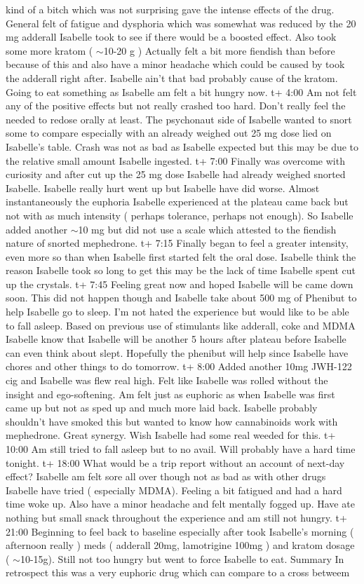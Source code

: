 \documentclass[12pt]{book}
\begin{document}
kind of a bitch which was not surprising gave the intense effects of the drug. General felt of fatigue and dysphoria which was somewhat was reduced by the 20 mg adderall Isabelle took to see if there would be a boosted effect. Also took some more kratom ( $\sim$10-20 g ) Actually felt a bit more fiendish than before because of this and also have a minor headache which could be caused by took the adderall right after. Isabelle ain't that bad probably cause of the kratom. Going to eat something as Isabelle am felt a bit hungry now. t+ 4:00 Am not felt any of the positive effects but not really crashed too hard. Don't really feel the needed to redose orally at least. The psychonaut side of Isabelle wanted to snort some to compare especially with an already weighed out 25 mg dose lied on Isabelle's table. Crash was not as bad as Isabelle expected but this may be due to the relative small amount Isabelle ingested. t+ 7:00 Finally was overcome with curiosity and after cut up the 25 mg dose Isabelle had already weighed snorted Isabelle. Isabelle really hurt went up but Isabelle have did worse. Almost instantaneously the euphoria Isabelle experienced at the plateau came back but not with as much intensity ( perhaps tolerance, perhaps not enough). So Isabelle added another $\sim$10 mg but did not use a scale which attested to the fiendish nature of snorted mephedrone. t+ 7:15 Finally began to feel a greater intensity, even more so than when Isabelle first started felt the oral dose. Isabelle think the reason Isabelle took so long to get this may be the lack of time Isabelle spent cut up the crystals. t+ 7:45 Feeling great now and hoped Isabelle will be came down soon. This did not happen though and Isabelle take about 500 mg of Phenibut to help Isabelle go to sleep. I'm not hated the experience but would like to be able to fall asleep. Based on previous use of stimulants like adderall, coke and MDMA Isabelle know that Isabelle will be another 5 hours after plateau before Isabelle can even think about slept. Hopefully the phenibut will help since Isabelle have chores and other things to do tomorrow. t+ 8:00 Added another 10mg JWH-122 cig and Isabelle was flew real high. Felt like Isabelle was rolled without the insight and ego-softening. Am felt just as euphoric as when Isabelle was first came up but not as sped up and much more laid back. Isabelle probably shouldn't have smoked this but wanted to know how cannabinoids work with mephedrone. Great synergy. Wish Isabelle had some real weeded for this. t+ 10:00 Am still tried to fall asleep but to no avail. Will probably have a hard time tonight. t+ 18:00 What would be a trip report without an account of next-day effect? Isabelle am felt sore all over though not as bad as with other drugs Isabelle have tried ( especially MDMA). Feeling a bit fatigued and had a hard time woke up. Also have a minor headache and felt mentally fogged up. Have ate nothing but small snack throughout the experience and am still not hungry. t+ 21:00 Beginning to feel back to baseline especially after took Isabelle's morning ( afternoon really ) meds ( adderall 20mg, lamotrigine 100mg ) and kratom dosage ( $\sim$10-15g). Still not too hungry but went to force Isabelle to eat. Summary In retrospect this was a very euphoric drug which can compare to a cross betweem 
\end{document}
